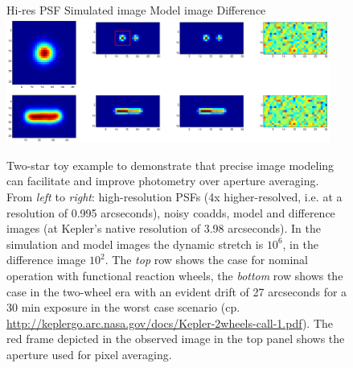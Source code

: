 \documentclass[letterpaper,12pt,whitepaper]{haastex}
\begin{document}
\begin{figure}[t]
\begin{center}
\footnotesize
\hspace{-2mm}Hi-res PSF \hspace{18mm} Simulated image \hspace{16mm} Model image
\hspace{18mm} Difference\\
\includegraphics[width=0.95\textwidth]{photometry_with_psf_with_frame2.png}

\caption{Two-star toy example to demonstrate that precise image
  modeling can facilitate and improve photometry over aperture
  averaging. From \emph{left} to \emph{right}: high-resolution PSFs
  (4x higher-resolved, i.e. at a resolution of 0.995 arcseconds),
  noisy coadds, model and difference images (at Kepler's native
  resolution of 3.98 arcseconds). In the simulation and model images
  the dynamic stretch is $10^6$, in the difference image $10^2$. The
  \emph{top} row shows the case for nominal operation with functional
  reaction wheels, the \emph{bottom} row shows the case in the
  two-wheel era with an evident drift of 27 arcseconds for a 30 min
  exposure in the worst case scenario (cp.
  \url{http://keplergo.arc.nasa.gov/docs/Kepler-2wheels-call-1.pdf}). The
  red frame depicted in the observed image in the top panel shows the
  aperture used for pixel averaging.}
\end{center}
\label{fig:photometry}
\end{figure}
\end{document}
